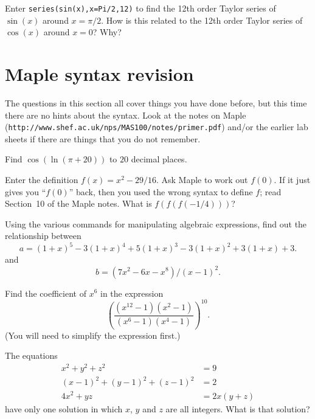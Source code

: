\documentclass[a4paper,10pt]{amsbook}
\numberwithin{example}{chapter}
\begin{document}
\begin{exercise}\label{ex-sin-shift}
 Enter \verb~series(sin(x),x=Pi/2,12)~ to find the 12th
 order Taylor series of $\sin(x)$ around $x=\pi/2$.  How
 is this related to the 12th order Taylor series of
 $\cos(x)$ around $x=0$?  Why? 
\end{exercise}

\section{Maple syntax revision}

The questions in this section all cover things you have done
before, but this time there are no hints about the syntax. 
Look at the notes on Maple
(\verb~http://www.shef.ac.uk/nps/MAS100/notes/primer.pdf~)
and/or the earlier lab sheets if there are things that you
do not remember. 

\begin{exercise}
 Find $\cos(\ln(\pi+20))$ to $20$ decimal places. 
\end{exercise}

\begin{exercise}
 Enter the definition $f(x)=x^2-29/16$.  Ask Maple to work
 out $f(0)$.  If it just gives you ``$f(0)$'' back, then you
 used the wrong syntax to define $f$; read Section~10 of the
 Maple notes.  What is $f(f(f(-1/4)))$? 
\end{exercise}

\begin{exercise}
 Using the various commands for manipulating
 algebraic expressions, find out the relationship between
 \[ a = (1+x)^5-3(1+x)^4+5(1+x)^3-3(1+x)^2+3(1+x)+3. \]
 and
 \[ b = (7x^2-6x-x^8)/(x-1)^2. \]
\end{exercise}

\begin{exercise}
 Find the coefficient of $x^6$ in the expression
 \[
  \left(\frac{(x^{12}-1)(x^2-1)}{(x^6-1)(x^4-1)}\right)^{10}. 
 \]
 (You will need to simplify the expression first.) 
\end{exercise}

\begin{exercise}
 The equations
 \begin{align*}
  x^2+y^2+z^2 &= 9 \\
  (x-1)^2 + (y-1)^2 + (z-1)^2 &= 2 \\
  4x^2+yz &= 2x(y+z) 
 \end{align*}
 have only one solution in which $x$, $y$ and $z$ are all
 integers.  What is that solution? 
\end{exercise}
\end{document}
